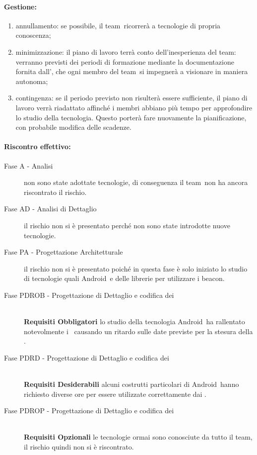 \documentclass[../PianoProgetto.tex]{subfiles}
\begin{document}
	\paragraph*{Gestione:}
	\begin{enumerate}
		\item annullamento: se possibile, il team\g\ ricorrerà a tecnologie di propria conoscenza;
		\item minimizzazione: il piano di lavoro terrà conto dell'inesperienza del team\g : verranno previsti dei periodi di formazione mediante la documentazione fornita dall'\amministratore , che ogni membro del team\g\ si impegnerà a visionare in maniera autonoma;
		\item contingenza: se il periodo previsto non risulterà essere sufficiente, il piano di lavoro verrà riadattato affinché i membri abbiano più tempo per approfondire lo studio della tecnologia. Questo porterà fare nuovamente la pianificazione, con probabile modifica delle scadenze.
	\end{enumerate}
	
	
	\paragraph*{Riscontro effettivo:} 
		\begin{description}
			\item[Fase A - Analisi] non sono state adottate tecnologie, di conseguenza il team\g\ non ha ancora riscontrato il rischio.
			\item[Fase AD - Analisi di Dettaglio] il rischio non si è presentato perché non sono state introdotte nuove tecnologie.
			\item[Fase PA - Progettazione Architetturale] il rischio non si è presentato poiché in questa fase è solo iniziato lo studio di tecnologie quali Android\g\ e delle librerie per utilizzare i beacon\g.
			\item[Fase PDROB - Progettazione di Dettaglio e codifica dei]  \ \\
					 \textbf{Requisiti Obbligatori} lo studio della tecnologia Android\g\ ha rallentato notevolmente i \progettisti\, causando un ritardo sulle date previste per la stesura della .
			\item[Fase PDRD - Progettazione di Dettaglio e codifica dei] \ \\
					\textbf{Requisiti Desiderabili} alcuni costrutti particolari di Android\g\ hanno richiesto diverse ore per essere utilizzate correttamente dai \programmatori.
			\item[Fase PDROP - Progettazione di Dettaglio e codifica dei]  \ \\
					\textbf{Requisiti Opzionali} le tecnologie ormai sono conosciute da tutto il team, il rischio quindi non si è riscontrato.
		\end{description}
\end{document}
